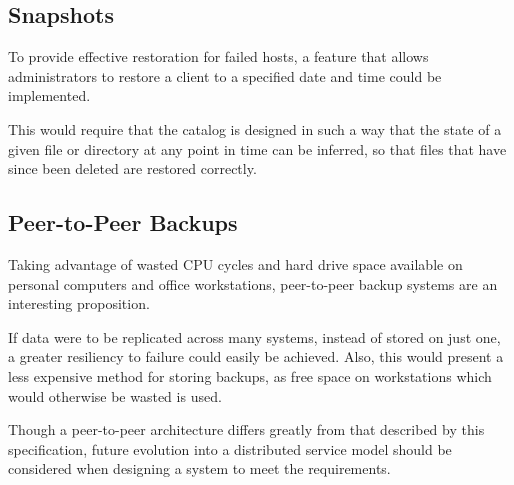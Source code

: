 \subsection{Snapshots}

To provide effective restoration for failed hosts, a feature that allows
administrators to restore a client to a specified date and time could be
implemented.

This would require that the catalog is designed in such a way that the state of
a given file or directory at any point in time can be inferred, so that files
that have since been deleted are restored correctly.

\subsection{Peer-to-Peer Backups}

Taking advantage of wasted CPU cycles and hard drive space available on
personal computers and office workstations, peer-to-peer backup systems are an
interesting proposition.

If data were to be replicated across many systems, instead of stored on just
one, a greater resiliency to failure could easily be achieved. Also, this would
present a less expensive method for storing backups, as free space on
workstations which would otherwise be wasted is used.

Though a peer-to-peer architecture differs greatly from that described by this
specification, future evolution into a distributed service model should be
considered when designing a system to meet the requirements.
